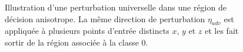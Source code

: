 \begin{figure}[H]
    \caption{Illustration d'une perturbation universelle dans une région de décision anisotrope. 
    La même direction de perturbation $\eta_{adv}$ est appliquée à plusieurs points d'entrée 
    distincts $x$, $y$ et $z$ et les fait sortir de la région associée à la classe 0.}
    \label{fig:vulnerabilite_universelle_exacte}
\end{figure}
